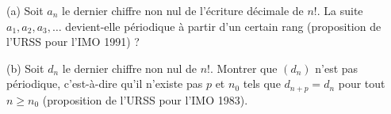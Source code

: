 (a) Soit $a_n$ le dernier chiffre non nul de l'écriture décimale de $n!$. La suite $a_1, a_2, a_3, \ldots$ devient-elle périodique à partir d'un certain rang (proposition de l'URSS pour l'IMO 1991) ?

(b) Soit $d_n$ le dernier chiffre non nul de $n!$. Montrer que $(d_n)$ n'est pas périodique, c'est-à-dire qu'il n'existe pas $p$ et $n_0$ tels que $d_{n+p} = d_n$ pour tout $n \geq n_0$ (proposition de l'URSS pour l'IMO 1983).
